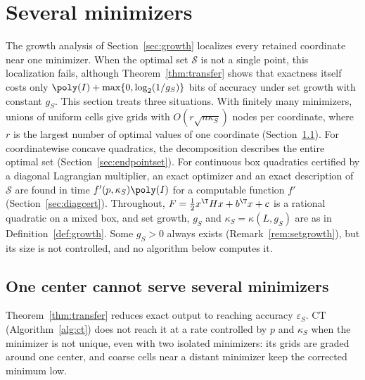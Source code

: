 \section{Several minimizers}\label{sec:optsets}
The growth analysis of Section~\ref{sec:growth} localizes every retained
coordinate near one minimizer. When the optimal set $\mathcal S$ is not a
single point, this localization fails, although Theorem~\ref{thm:transfer}
shows that exactness itself costs only $\poly(I)+\max\{0,\log_2(1/g_S)\}$
bits of accuracy under set growth with constant $g_S$. This section treats three
situations. With finitely many minimizers, unions of uniform cells give grids
with $O(r\sqrt{n\kappa_S})$ nodes per coordinate, where $r$ is the largest
number of optimal values of one coordinate
(Section~\ref{sec:exact-nonunique}). For coordinatewise concave quadratics,
the decomposition describes the entire optimal set
(Section~\ref{sec:endpointset}). For continuous box quadratics certified by a
diagonal Lagrangian multiplier, an exact optimizer and an exact description
of $\mathcal S$ are found in time $f'(p,\kappa_S)\poly(I)$ for a computable
function $f'$ (Section~\ref{sec:diagcert}). Throughout, $F=\frac12x^\T Hx+b^\T x+c$ is a
rational quadratic on a mixed box, and set growth, $g_S$ and
$\kappa_S=\kappa(L,g_S)$ are as in Definition~\ref{def:growth}. Some $g_S>0$
always exists (Remark~\ref{rem:setgrowth}), but its size is not controlled,
and no algorithm below computes it.

\subsection{One center cannot serve several minimizers}\label{sec:exact-nonunique}

Theorem~\ref{thm:transfer} reduces exact output to reaching accuracy
$\varepsilon_S$. CT (Algorithm~\ref{alg:ct}) does not reach it at a rate
controlled by $p$ and $\kappa_S$ when the minimizer is not unique, even with
two isolated minimizers: its grids are graded around one center, and coarse
cells near a distant minimizer keep the corrected minimum low.

